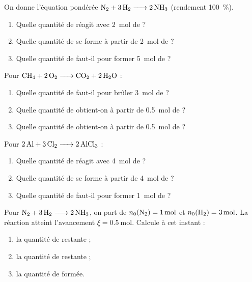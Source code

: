 \documentclass[11pt,a4paper]{article}
\begin{document}
\begin{exo}
On donne l'équation pondérée $\ce{N2 + 3 H2 -> 2 NH3}$ (rendement \qty{100}{\percent}).
\begin{enumerate}[label=\alph*)]
  \item Quelle quantité de  réagit avec \qty{2}{\mole} de  ?
  \item Quelle quantité de  se forme à partir de \qty{2}{\mole} de  ?
  \item Quelle quantité de  faut-il pour former \qty{5}{\mole} de  ?
\end{enumerate}
\end{exo}

\begin{exo}
Pour $\ce{CH4 + 2 O2 -> CO2 + 2 H2O}$ :
\begin{enumerate}[label=\alph*)]
  \item Quelle quantité de  faut-il pour brûler \qty{3}{\mole} de  ?
  \item Quelle quantité de  obtient-on à partir de \qty{0.5}{\mole} de  ?
  \item Quelle quantité de  obtient-on à partir de \qty{0.5}{\mole} de  ?
\end{enumerate}
\end{exo}

\begin{exo}
Pour $\ce{2 Al + 3 Cl2 -> 2 AlCl3}$ :
\begin{enumerate}[label=\alph*)]
  \item Quelle quantité de  réagit avec \qty{4}{\mole} de  ?
  \item Quelle quantité de  se forme à partir de \qty{4}{\mole} de  ?
  \item Quelle quantité de  faut-il pour former \qty{1}{\mole} de  ?
\end{enumerate}
\end{exo}

\begin{exo}
Pour $\ce{N2 + 3 H2 -> 2 NH3}$, on part de $n_0(\ce{N2})=\qty{1}{\mole}$ et
$n_0(\ce{H2})=\qty{3}{\mole}$. La réaction atteint l'avancement $\xi=\qty{0.5}{\mole}$.
Calcule à cet instant :
\begin{enumerate}[label=\alph*)]
  \item la quantité de  restante ;
  \item la quantité de  restante ;
  \item la quantité de  formée.
\end{enumerate}
\end{exo}
\end{document}
